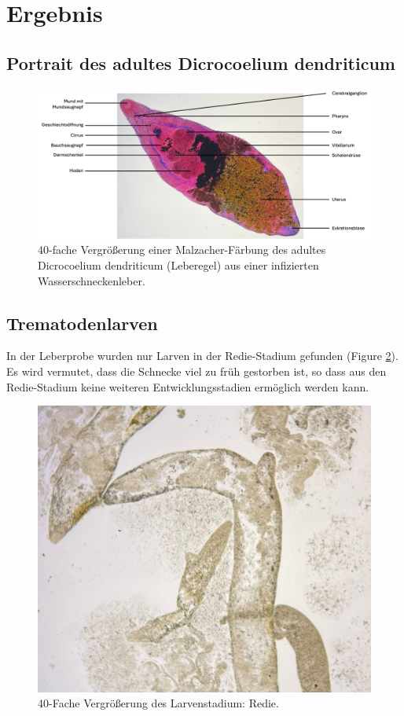 \documentclass[oneside,10pt,a4paper]{report}
\begin{document}
		\section{Ergebnis}
			\subsection{Portrait des adultes Dicrocoelium dendriticum}
				\begin{figure}[H]
					\centering
					\includegraphics[scale=0.75, angle = 90]{Dicrocoelium dendriticum.png}
					\caption{40-fache Vergrößerung einer Malzacher-Färbung des adultes Dicrocoelium dendriticum (Leberegel) aus einer infizierten Wasserschneckenleber.}
					\label{fig: TrematodenMalzacherfärbung}
				\end{figure}
			\subsection{Trematodenlarven}
				In der Leberprobe wurden nur Larven in der Redie-Stadium gefunden (Figure \ref{fig: Trematodenlarven}).\\
				Es wird vermutet, dass die Schnecke viel zu früh gestorben ist, so dass aus den Redie-Stadium keine weiteren Entwicklungsstadien ermöglich werden kann.
				\begin{figure}[H]
					\centering
					\includegraphics[scale=0.5]{Trematodenlarven.jpg}
					\caption{40-Fache Vergrößerung des Larvenstadium: Redie.}
					\label{fig: Trematodenlarven}
				\end{figure}
				
\end{document}
